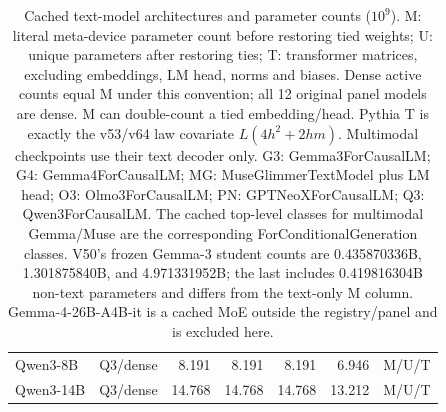 \begin{table}[H]
\begin{tabular}{@{}llrrrrr@{}}
Qwen3-8B & Q3/dense & 8.191 & 8.191 & 8.191 & 6.946 & M/U/T \\
Qwen3-14B & Q3/dense & 14.768 & 14.768 & 14.768 & 13.212 & M/U/T \\
\bottomrule
\end{tabular}
\caption{Cached text-model architectures and parameter counts ($10^9$). M: literal meta-device parameter count before restoring tied weights; U: unique parameters after restoring ties; T: transformer matrices, excluding embeddings, LM head, norms and biases. Dense active counts equal M under this convention; all 12 original panel models are dense. M can double-count a tied embedding/head. Pythia T is exactly the v53/v64 law covariate $L(4h^2+2hm)$. Multimodal checkpoints use their text decoder only. G3: Gemma3ForCausalLM; G4: Gemma4ForCausalLM; MG: MuseGlimmerTextModel plus LM head; O3: Olmo3ForCausalLM; PN: GPTNeoXForCausalLM; Q3: Qwen3ForCausalLM. The cached top-level classes for multimodal Gemma/Muse are the corresponding ForConditionalGeneration classes. V50's frozen Gemma-3 student counts are 0.435870336B, 1.301875840B, and 4.971331952B; the last includes 0.419816304B non-text parameters and differs from the text-only M column. Gemma-4-26B-A4B-it is a cached MoE outside the registry/panel and is excluded here.}
\label{tab:model_arch}
\end{table}
